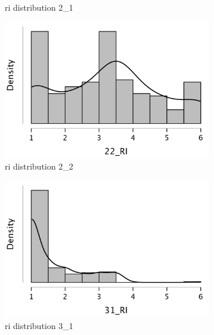 \documentclass[
  a4paper,  %
  twoside,  %
  bibliography=totoc,
  headsepline,
  cleardoublepage=empty,
  parskip=half,
  draft=false
]{scrbook}
\begin{document}
\begin{figure}[h]
\begin{subfigure}{0.3\textwidth}
    \caption{\gls{ri} distribution 2\_1}
    \label{fig:RI21}
  \end{subfigure}
  \begin{subfigure}{0.3\textwidth}
    \includegraphics[width=\linewidth]{graphics/images/statistics/RIs/22_RI.png}
    \caption{\gls{ri} distribution 2\_2}
    \label{fig:RI22}
  \end{subfigure}
  \begin{subfigure}{0.3\textwidth}
    \includegraphics[width=\linewidth]{graphics/images/statistics/RIs/31_RI.png}
    \caption{\gls{ri} distribution 3\_1}
    \label{fig:RI31}
  \end{subfigure}
  \begin{subfigure}{0.3\textwidth}

\end{subfigure}
\end{figure}
\end{document}
